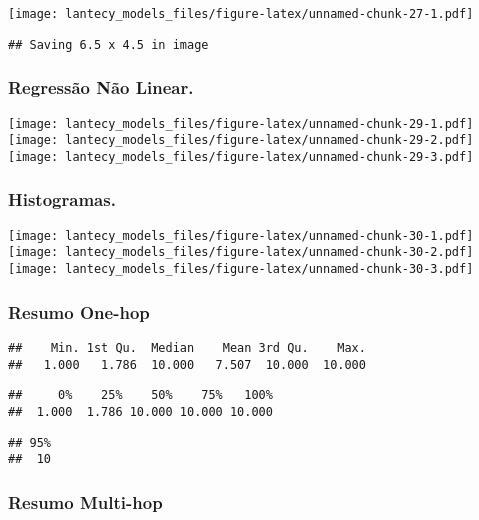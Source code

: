 \documentclass[
]{article}
\begin{document}
\texttt{[image: lantecy\_models\_files/figure-latex/unnamed-chunk-27-1.pdf]}

\begin{verbatim}
## Saving 6.5 x 4.5 in image
\end{verbatim}

\hypertarget{regressuxe3o-nuxe3o-linear.}{%
\subsubsection{Regressão Não
Linear.}\label{regressuxe3o-nuxe3o-linear.}}

\texttt{[image: lantecy\_models\_files/figure-latex/unnamed-chunk-29-1.pdf]}
\texttt{[image: lantecy\_models\_files/figure-latex/unnamed-chunk-29-2.pdf]}
\texttt{[image: lantecy\_models\_files/figure-latex/unnamed-chunk-29-3.pdf]}

\hypertarget{histogramas.}{%
\subsubsection{Histogramas.}\label{histogramas.}}

\texttt{[image: lantecy\_models\_files/figure-latex/unnamed-chunk-30-1.pdf]}
\texttt{[image: lantecy\_models\_files/figure-latex/unnamed-chunk-30-2.pdf]}
\texttt{[image: lantecy\_models\_files/figure-latex/unnamed-chunk-30-3.pdf]}

\hypertarget{resumo-one-hop}{%
\subsubsection{Resumo One-hop}\label{resumo-one-hop}}

\begin{verbatim}
##    Min. 1st Qu.  Median    Mean 3rd Qu.    Max. 
##   1.000   1.786  10.000   7.507  10.000  10.000
\end{verbatim}

\begin{verbatim}
##     0%    25%    50%    75%   100% 
##  1.000  1.786 10.000 10.000 10.000
\end{verbatim}

\begin{verbatim}
## 95% 
##  10
\end{verbatim}

\hypertarget{resumo-multi-hop}{%
\subsubsection{Resumo Multi-hop}\label{resumo-multi-hop}}
\end{document}
